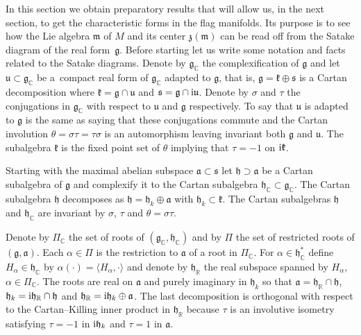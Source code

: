 \documentclass[pdftex]{sigma}
\numberwithin{equation}{section}
\begin{document}
In this section we obtain preparatory results that will allow us, in the next section, to get the characteristic forms in the flag manifolds. Its purpose is to see how the Lie algebra $\mathfrak{m}$ of $M$ and its center $\mathfrak{z}(\mathfrak{m}) $ can be read off from the Satake diagram of the real form~$\mathfrak{g}$. Before starting let us write some notation and facts related to the Satake diagrams. Denote by $\mathfrak{g}_{\mathbb{C}}$ the complexification of $\mathfrak{g}$ and let $\mathfrak{u}\subset \mathfrak{g}_{\mathbb{C}}$ be a~compact real form of $\mathfrak{g}_{\mathbb{C}}$ adapted to $\mathfrak{g}$, that is, $\mathfrak{g}=\mathfrak{k}\oplus \mathfrak{s}$ is a Cartan decomposition where $\mathfrak{k}=\mathfrak{g}\cap \mathfrak{u}$ and $\mathfrak{s}=\mathfrak{g}\cap {\rm i}\mathfrak{u}$. Denote by $\sigma $ and $\tau $ the conjugations in $\mathfrak{g}_{\mathbb{C}}$ with respect to $\mathfrak{u}$ and $\mathfrak{g}$ respectively. To say that $\mathfrak{u}$ is adapted to $\mathfrak{g}$ is the same as saying that these conjugations commute and the Cartan involution $\theta =\sigma \tau =\tau \sigma $ is an automorphism leaving invariant both $\mathfrak{g}$ and $\mathfrak{u}$. The subalgebra $\mathfrak{k}$ is the fixed point set of $\theta $ implying that $\tau =-1$ on ${\rm i}\mathfrak{k}$.

Starting with the maximal abelian subspace $\mathfrak{a}\subset \mathfrak{s}$ let $\mathfrak{h}\supset \mathfrak{a}$ be a Cartan subalgebra of $\mathfrak{g}$ and complexify it to the Cartan subalgebra $\mathfrak{h}_{\mathbb{C}}\subset \mathfrak{g}_{\mathbb{C}}$. The Cartan subalgebra $\mathfrak{h}$ decomposes as $\mathfrak{h}=\mathfrak{h}_{k}\oplus \mathfrak{a}$ with $\mathfrak{h}_{k}\subset \mathfrak{k}$. The Cartan subalgebras $\mathfrak{h}$ and $\mathfrak{h}_{\mathbb{C}}$ are invariant by $\sigma $, $\tau $ and $\theta =\sigma \tau $.

Denote by $\Pi _{\mathbb{C}}$ the set of roots of $ ( \mathfrak{g}_{\mathbb{C}},\mathfrak{h}_{\mathbb{C}} ) $ and by $\Pi $ the set of restricted roots of $ ( \mathfrak{g},\mathfrak{a} ) $. Each $\alpha\in \Pi $ is the restriction to $\mathfrak{a}$ of a root in $\Pi _{\mathbb{C}}$. For $\alpha \in \mathfrak{h}_{\mathbb{C}}^{\ast }$ define $H_{\alpha}\in \mathfrak{h}_{\mathbb{C}}$ by $\alpha (\cdot) =\langle H_{\alpha },\cdot \rangle $ and denote by $\mathfrak{h}_{\mathbb{R}}$ the real subspace spanned by $H_{\alpha }$, $\alpha \in \Pi _{\mathbb{C}}$. The roots are real on $\mathfrak{a}$ and purely imaginary in $\mathfrak{h}_{k}$ so that $\mathfrak{a}=\mathfrak{h}_{\mathbb{R}}\cap \mathfrak{h}$, $\mathfrak{h}_{k}={\rm i}\mathfrak{h}_{\mathbb{R}}\cap \mathfrak{h}$ and $\mathfrak{h}_{\mathbb{R}}={\rm i}\mathfrak{h}_{k}\oplus \mathfrak{a}$. The last decomposition is orthogonal with respect to the Cartan--Killing inner product in $\mathfrak{h}_{\mathbb{R}}$ because $\tau $ is an involutive isometry satisfying $\tau =-1$ in ${\rm i}\mathfrak{h}_{k}$ and $\tau =1$ in $\mathfrak{a}$.
\end{document}
